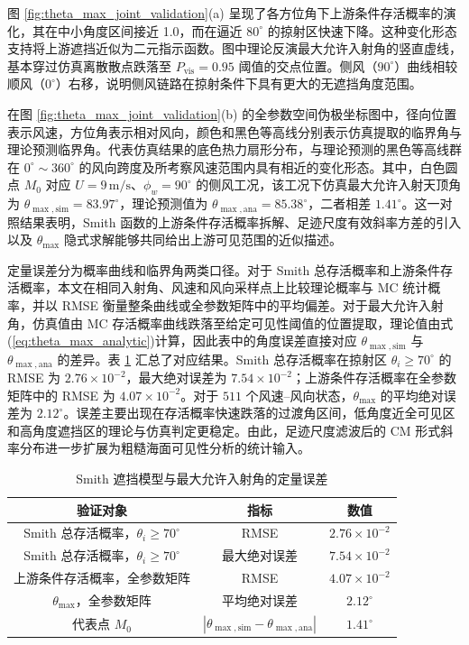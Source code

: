 图 \ref{fig:theta_max_joint_validation}(a) 呈现了各方位角下上游条件存活概率的演化，其在中小角度区间接近 1.0，而在逼近 $80^\circ$ 的掠射区快速下降。这种变化形态支持将上游遮挡近似为二元指示函数。图中理论反演最大允许入射角的竖直虚线，基本穿过仿真离散散点跌落至 $P_{\mathrm{vis}}=0.95$ 阈值的交点位置。侧风（$90^\circ$）曲线相较顺风（$0^\circ$）右移，说明侧风链路在掠射条件下具有更大的无遮挡角度范围。

在图 \ref{fig:theta_max_joint_validation}(b) 的全参数空间伪极坐标图中，径向位置表示风速，方位角表示相对风向，颜色和黑色等高线分别表示仿真提取的临界角与理论预测临界角。代表仿真结果的底色热力扇形分布，与理论预测的黑色等高线群在 $0^\circ \sim 360^\circ$ 的风向跨度及所考察风速范围内具有相近的变化形态。其中，白色圆点 $M_0$ 对应 $U=9\,\mathrm{m/s}$、$\phi_w=90^\circ$ 的侧风工况，该工况下仿真最大允许入射天顶角为 $\theta_{\max,\mathrm{sim}}=83.97^\circ$，理论预测值为 $\theta_{\max,\mathrm{ana}}=85.38^\circ$，二者相差 $1.41^\circ$。这一对照结果表明，Smith 函数的上游条件存活概率拆解、足迹尺度有效斜率方差的引入以及 $\theta_{\max}$ 隐式求解能够共同给出上游可见范围的近似描述。

定量误差分为概率曲线和临界角两类口径。对于 Smith 总存活概率和上游条件存活概率，本文在相同入射角、风速和风向采样点上比较理论概率与 MC 统计概率，并以 RMSE 衡量整条曲线或全参数矩阵中的平均偏差。对于最大允许入射角，仿真值由 MC 存活概率曲线跌落至给定可见性阈值的位置提取，理论值由式(\ref{eq:theta_max_analytic})计算，因此表中的角度误差直接对应 $\theta_{\max,\mathrm{sim}}$ 与 $\theta_{\max,\mathrm{ana}}$ 的差异。表 \ref{tab:c3_shadow_quant_metrics} 汇总了对应结果。Smith 总存活概率在掠射区 $\theta_i\geq 70^\circ$ 的 RMSE 为 $2.76\times10^{-2}$，最大绝对误差为 $7.54\times10^{-2}$；上游条件存活概率在全参数矩阵中的 RMSE 为 $4.07\times10^{-2}$。对于 $511$ 个风速--风向状态，$\theta_{\max}$ 的平均绝对误差为 $2.12^\circ$。误差主要出现在存活概率快速跌落的过渡角区间，低角度近全可见区和高角度遮挡区的理论与仿真判定更稳定。由此，足迹尺度滤波后的 CM 形式斜率分布进一步扩展为粗糙海面可见性分析的统计输入。

\begin{table}[htbp]
	\centering
	\caption{Smith 遮挡模型与最大允许入射角的定量误差}
	\label{tab:c3_shadow_quant_metrics}
	\begin{tabular}{ccc}
		\toprule
		验证对象 & 指标 & 数值 \\
		\midrule
		Smith 总存活概率，$\theta_i\geq70^\circ$ & RMSE & $2.76\times10^{-2}$ \\
		Smith 总存活概率，$\theta_i\geq70^\circ$ & 最大绝对误差 & $7.54\times10^{-2}$ \\
		上游条件存活概率，全参数矩阵 & RMSE & $4.07\times10^{-2}$ \\
		$\theta_{\max}$，全参数矩阵 & 平均绝对误差 & $2.12^\circ$ \\
		代表点 $M_0$ & $|\theta_{\max,\mathrm{sim}}-\theta_{\max,\mathrm{ana}}|$ & $1.41^\circ$ \\
		\bottomrule
	\end{tabular}
\end{table}

